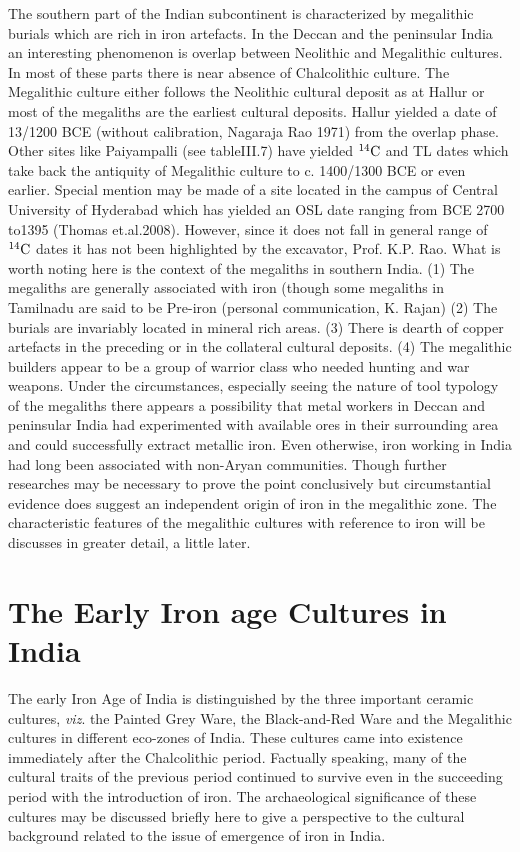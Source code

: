 The southern part of the Indian subcontinent is characterized by megalithic burials which are rich in iron artefacts. In the Deccan and the peninsular India an interesting phenomenon is overlap between Neolithic and Megalithic cultures. In most of these parts there is near absence of Chalcolithic culture. The Megalithic culture either follows the Neolithic cultural deposit as at Hallur or most of the megaliths are the earliest cultural deposits. Hallur yielded a date of 13/1200 BCE (without calibration, Nagaraja Rao 1971) from the overlap phase. Other sites like Paiyampalli (see tableIII.7) have yielded $^{14}{\rm C}$ and TL dates which take back the antiquity of Megalithic culture to c. 1400/1300 BCE or even earlier. Special mention may be made of a site located in the campus of Central University of Hyderabad which has yielded an OSL date ranging from BCE 2700 to1395 (Thomas et.al.2008). However, since it does not fall in general range of $^{14}{\rm C}$ dates it has not been highlighted by the excavator, Prof. K.P. Rao. What is worth noting here is the context of the megaliths in southern India. (1) The megaliths are generally associated with iron (though some megaliths in Tamilnadu are said to be Pre-iron (personal communication, K. Rajan) (2) The burials are invariably located in mineral rich areas. (3) There is dearth of copper artefacts in the preceding or in the collateral cultural deposits. (4) The megalithic builders appear to be a group of warrior class who needed hunting and war weapons. Under the circumstances, especially seeing the nature of tool typology of the megaliths there appears a possibility that metal workers in Deccan and peninsular India had experimented with available ores in their surrounding area and could successfully extract metallic iron. Even otherwise, iron working in India had long been associated with non-Aryan communities. Though further researches may be necessary to prove the point conclusively but circumstantial evidence does suggest an independent origin of iron in the megalithic zone. The characteristic features of the megalithic cultures with reference to iron will be discusses in greater detail, a little later.

\section*{The Early Iron age Cultures in India}\label{section-3}

The early Iron Age of India is distinguished by the three important ceramic cultures, \textit{viz}. the Painted Grey Ware, the Black-and-Red Ware and the Megalithic cultures in different eco-zones of India. These cultures came into existence immediately after the Chalcolithic period. Factually speaking, many of the cultural traits of the previous period continued to survive even in the succeeding period with the introduction of iron. The archaeological significance of these cultures may be discussed briefly here to give a perspective to the cultural background related to the issue of emergence of iron in India.

